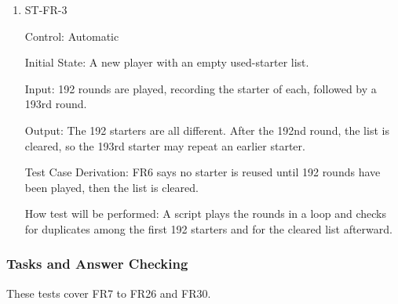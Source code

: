 \documentclass[12pt, titlepage]{article}
\begin{document}
\begin{enumerate}
\item{ST-FR-3\\}

Control: Automatic

Initial State: A new player with an empty used-starter list.

Input: 192 rounds are played, recording the starter of each, followed by a 193rd round.

Output: The 192 starters are all different. After the 192nd round, the list is cleared, so the 193rd starter may repeat an earlier starter.

Test Case Derivation: FR6 says no starter is reused until 192 rounds have been played, then the list is cleared.

How test will be performed: A script plays the rounds in a loop and checks for duplicates among the first 192 starters and for the cleared list afterward.

\end{enumerate}

\subsubsection{Tasks and Answer Checking}

These tests cover FR7 to FR26 and FR30.
\end{document}
